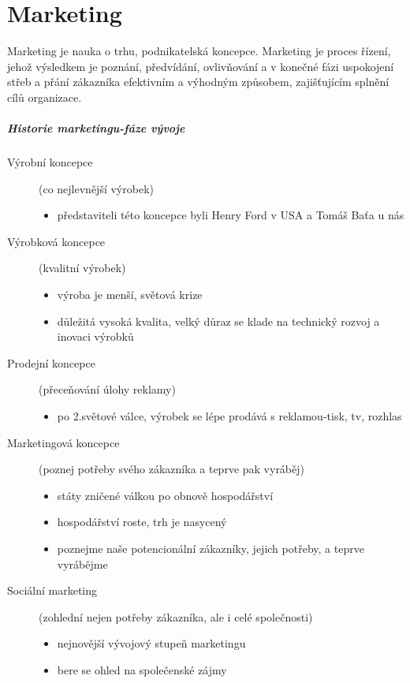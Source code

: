 \chapter{Marketing}

Marketing je nauka o trhu, podnikatelská koncepce. Marketing je proces řízení, jehož výsledkem je poznání, předvídání, ovlivňování a v konečné fázi uspokojení střeb a přání zákazníka efektivním a výhodným způsobem, zajišťujícím splnění cílů organizace.

\paragraph*{Historie marketingu-fáze vývoje}
\begin{description}
    \item[Výrobní koncepce] (co nejlevnější výrobek)
        \begin{itemize}
            \item představiteli této koncepce byli Henry Ford v USA a Tomáš Baťa u nás
        \end{itemize}
    \item[Výrobková koncepce] (kvalitní výrobek)
        \begin{itemize}
            \item výroba je menší, světová krize
            \item důležitá vysoká kvalita, velký důraz se klade na technický rozvoj a inovaci výrobků
        \end{itemize}
    \item[Prodejní koncepce] (přeceňování úlohy reklamy)
        \begin{itemize}
            \item po 2.světové válce, výrobek se lépe prodává s reklamou-tisk, tv, rozhlas
        \end{itemize}
    \item[Marketingová koncepce] (poznej potřeby svého zákazníka a teprve pak vyráběj)
        \begin{itemize}
            \item státy zničené válkou po obnově hospodářství
            \item hospodářství roste, trh je nasycený
            \item poznejme naše potencionální zákazníky, jejich potřeby, a teprve vyrábějme
        \end{itemize}
    \item[Sociální marketing] (zohlední nejen potřeby zákazníka, ale i celé společnosti)
        \begin{itemize}
            \item nejnovější vývojový stupeň marketingu
            \item bere se ohled na společenské zájmy
        \end{itemize}
\end{description}

